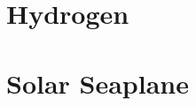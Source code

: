     \section{Hydrogen} %
    \label{sec:hydrogen}


    \section{Solar Seaplane} %
    \label{sec:solar-seaplane}


